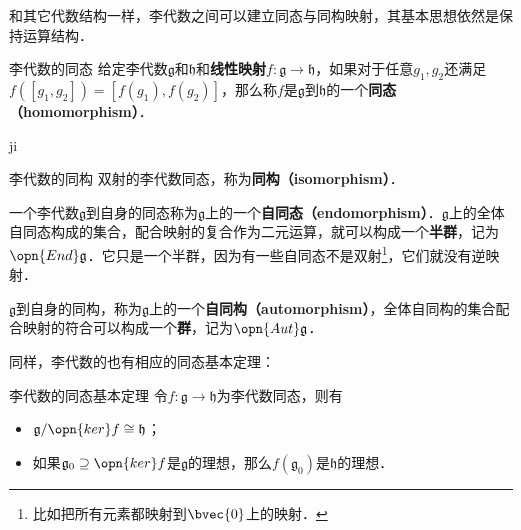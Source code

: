 

和其它代数结构一样，李代数之间可以建立同态与同构映射，其基本思想依然是保持运算结构．

\begin{definition}{李代数的同态}
给定李代数$\mathfrak{g}$和$\mathfrak{h}$和\textbf{线性映射}$f:\mathfrak{g}\to\mathfrak{h}$，如果对于任意$g_1, g_2$还满足$f([g_1, g_2])=[f(g_1), f(g_2)]$，那么称$f$是$\mathfrak{g}$到$\mathfrak{h}$的一个\textbf{同态（homomorphism）}．

ji
\end{definition}

\begin{definition}{李代数的同构}
双射的李代数同态，称为\textbf{同构（isomorphism）}．
\end{definition}

一个李代数$\mathfrak{g}$到自身的同态称为$\mathfrak{g}$上的一个\textbf{自同态（endomorphism）}．$\mathfrak{g}$上的全体自同态构成的集合，配合映射的复合作为二元运算，就可以构成一个\textbf{半群}，记为$\opn{End}\mathfrak{g}$．它只是一个半群，因为有一些自同态不是双射\footnote{比如把所有元素都映射到$\bvec{0}$上的映射．}，它们就没有逆映射．

$\mathfrak{g}$到自身的同构，称为$\mathfrak{g}$上的一个\textbf{自同构（automorphism）}，全体自同构的集合配合映射的符合可以构成一个\textbf{群}，记为$\opn{Aut}\mathfrak{g}$．

同样，李代数的也有相应的同态基本定理：

\begin{definition}{李代数的同态基本定理}
令$f:\mathfrak{g}\to \mathfrak{h}$为李代数同态，则有
\begin{itemize}
\item $\mathfrak{g}/\opn{ker} f\cong \mathfrak{h}$；
\item 如果$\mathfrak{g}_0\supseteq \opn{ker}f$是$\mathfrak{g}$的理想，那么$f(\mathfrak{g}_0)$是$\mathfrak{h}$的理想．
\end{itemize}
\end{definition}












